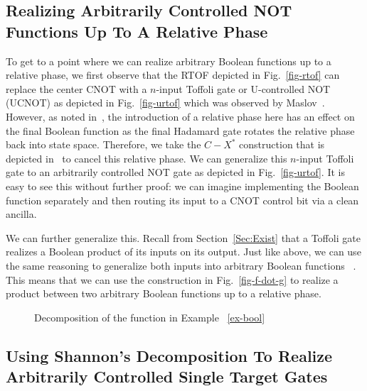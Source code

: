 \subsection{Realizing Arbitrarily Controlled NOT Functions Up To A Relative Phase}
\label{Subsec:UNOT}
To get to a point where we can realize arbitrary Boolean functions up to a relative phase, we first observe that the RTOF depicted in Fig.~\ref{fig-rtof} can replace the center CNOT with a $n$-input Toffoli gate or U-controlled NOT (UCNOT) as depicted in Fig.~\ref{fig-urtof} which was observed by Maslov~\cite{bib-rtof-maslov}. However, as noted in~\cite{bib-amy-phase-state}, the introduction of a relative phase here has an effect on the final Boolean function as the final Hadamard gate rotates the relative phase back into state space. Therefore, we take the $C-X^*$ construction that is depicted in~\cite{bib-amy-phase-state} to cancel this relative phase. We can generalize this $n$-input Toffoli gate to an arbitrarily controlled NOT gate as depicted in Fig.~\ref{fig-urtof}. It is easy to see this without further proof: we can imagine implementing the Boolean function separately and then routing its input to a CNOT control bit via a clean ancilla.

We can further generalize this. Recall from Section~\ref{Sec:Exist} that a Toffoli gate realizes a Boolean product of its inputs on its output. Just like above, we can use the same reasoning to generalize both inputs into arbitrary Boolean functions~\cite{bib-amy-phase-state} . This means that we can use the construction in Fig.~\ref{fig-f-dot-g} to realize a product between two arbitrary Boolean functions up to a relative phase. 

\begin{figure}[t]
  \begin{minipage}{\linewidth}
      \begin{center}
        
      \end{center}
      \caption{Decomposition of the function in Example ~\ref{ex-bool}}
      \label{fig-func-decomp}
  \end{minipage}
  \vspace*{-0.25cm}
\end{figure}

\subsection{Using Shannon's Decomposition To Realize Arbitrarily Controlled Single Target Gates}

